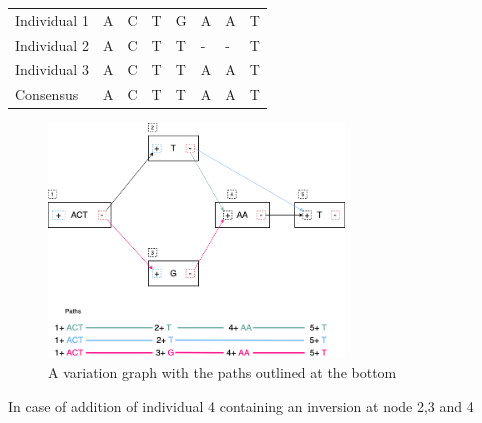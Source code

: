 \documentclass[10pt, a4paper]{article}
\begin{document}
\begin{center}
\begin{tabular}{llllllll}
\color{mypink}Individual 1 & \color{mypink} A & \color{mypink} C & \color{mypink} T & \color{mypink} G & \color{mypink} A & \color{mypink} A & \color{mypink} T\\
\color{myblue}Individual 2 & \color{myblue} A & \color{myblue} C & \color{myblue} T & \color{myblue} T & \color{myblue} - & \color{myblue} - & \color{myblue} T\\
\color{mygreen}Individual 3 & \color{mygreen} A & \color{mygreen} C & \color{mygreen} T & \color{mygreen} T & \color{mygreen} A & \color{mygreen} A & \color{mygreen} T\\
\hline
\color{red}Consensus & \color{red} A & \color{red} C & \color{red} T & \color{red} T & \color{red} A & \color{myred} A & \color{red} T\\
\end{tabular}

\end{center}


\begin{figure}[h!]
\centering
\includegraphics[width=0.7\textwidth]{./figures/Variation-Graph-Page-1.png}
\caption[Variation Graph]{\label{fig:orgcb5d37a}A variation graph with the paths outlined at the bottom}
\end{figure}


In case of addition of individual 4 containing an inversion at node 2,3 and 4
\end{document}
